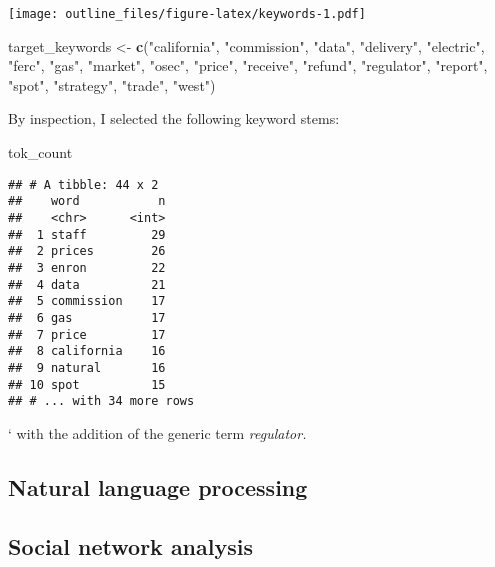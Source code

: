 \documentclass[]{article}
\newenvironment{Shaded}{\begin{snugshade}}{\end{snugshade}}
\newcommand{\KeywordTok}[1]{\textcolor[rgb]{0.13,0.29,0.53}{\textbf{#1}}}
\newcommand{\NormalTok}[1]{#1}
\newcommand{\StringTok}[1]{\textcolor[rgb]{0.31,0.60,0.02}{#1}}
\begin{document}
\texttt{[image: outline\_files/figure-latex/keywords-1.pdf]}

\begin{Shaded}
\begin{Highlighting}[]
\NormalTok{target_keywords <-}\StringTok{ }\KeywordTok{c}\NormalTok{(}\StringTok{"california"}\NormalTok{, }\StringTok{"commission"}\NormalTok{, }\StringTok{"data"}\NormalTok{, }\StringTok{"delivery"}\NormalTok{, }\StringTok{"electric"}\NormalTok{, }\StringTok{"ferc"}\NormalTok{, }\StringTok{"gas"}\NormalTok{, }\StringTok{"market"}\NormalTok{, }\StringTok{"osec"}\NormalTok{, }\StringTok{"price"}\NormalTok{, }\StringTok{"receive"}\NormalTok{, }\StringTok{"refund"}\NormalTok{, }\StringTok{"regulator"}\NormalTok{, }\StringTok{"report"}\NormalTok{, }\StringTok{"spot"}\NormalTok{, }\StringTok{"strategy"}\NormalTok{, }\StringTok{"trade"}\NormalTok{, }\StringTok{"west"}\NormalTok{)}
\end{Highlighting}
\end{Shaded}

By inspection, I selected the following keyword stems:

\begin{Shaded}
\begin{Highlighting}[]
\NormalTok{tok_count}
\end{Highlighting}
\end{Shaded}

\begin{verbatim}
## # A tibble: 44 x 2
##    word           n
##    <chr>      <int>
##  1 staff         29
##  2 prices        26
##  3 enron         22
##  4 data          21
##  5 commission    17
##  6 gas           17
##  7 price         17
##  8 california    16
##  9 natural       16
## 10 spot          15
## # ... with 34 more rows
\end{verbatim}

` with the addition of the generic term \emph{regulator.}

\hypertarget{natural-language-processing}{%
\subsection{Natural language
processing}\label{natural-language-processing}}

\hypertarget{social-network-analysis}{%
\subsection{Social network analysis}\label{social-network-analysis}}
\end{document}
